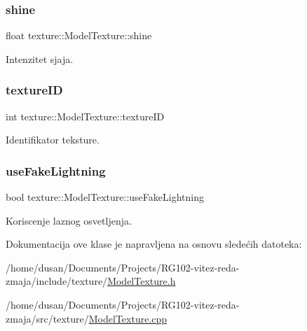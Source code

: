 \subsubsection{\texorpdfstring{shine}{shine}}
{\footnotesize\ttfamily float texture\+::\+Model\+Texture\+::shine\hspace{0.3cm}{\ttfamily [private]}}



Intenzitet sjaja. 

\mbox{\label{classtexture_1_1ModelTexture_a0dca1304604e6b705acb0460b66fce36}} 
\subsubsection{\texorpdfstring{texture\+ID}{textureID}}
{\footnotesize\ttfamily int texture\+::\+Model\+Texture\+::texture\+ID\hspace{0.3cm}{\ttfamily [private]}}



Identifikator teksture. 

\mbox{\label{classtexture_1_1ModelTexture_aa14650f7cc629b9f5c0ed15f82b22cad}} 
\subsubsection{\texorpdfstring{use\+Fake\+Lightning}{useFakeLightning}}
{\footnotesize\ttfamily bool texture\+::\+Model\+Texture\+::use\+Fake\+Lightning\hspace{0.3cm}{\ttfamily [private]}}



Koriscenje laznog osvetljenja. 



Dokumentacija ove klase je napravljena na osnovu sledećih datoteka\+:\begin{DoxyCompactItemize}
\item 
/home/dusan/\+Documents/\+Projects/\+R\+G102-\/vitez-\/reda-\/zmaja/include/texture/\hyperlink{ModelTexture_8h}{Model\+Texture.\+h}\item 
/home/dusan/\+Documents/\+Projects/\+R\+G102-\/vitez-\/reda-\/zmaja/src/texture/\hyperlink{ModelTexture_8cpp}{Model\+Texture.\+cpp}\end{DoxyCompactItemize}
